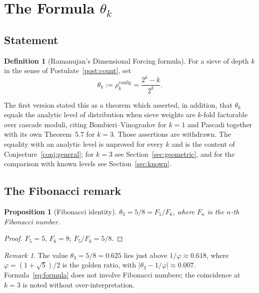 \documentclass[12pt]{amsart}
\theoremstyle{plain}
\newtheorem{proposition}[theorem]{Proposition}
\theoremstyle{definition}
\newtheorem{definition}[theorem]{Definition}
\theoremstyle{remark}
\newtheorem{remark}[theorem]{Remark}
\newcommand{\thetak}{\theta_k}
\newcommand{\rhoc}{\rho^{\mathrm{config}}}
\begin{document}
\section{The Formula $\thetak$}
\label{sec:formula}

\subsection{Statement}

\begin{definition}[Ramanujan's Dimensional Forcing formula]
\label{def:formula}
For a sieve of depth $k$ in the sense of Postulate~\ref{post:count}, set
\[
  \thetak := \rhoc_k = \frac{2^k - k}{2^k}.
\]
\end{definition}

The first version stated this as a theorem which asserted, in addition, that
$\thetak$ equals the analytic level of distribution when sieve weights are
$k$-fold factorable over cascade moduli, citing Bombieri--Vinogradov for $k=1$
and Pascadi together with its own Theorem~5.7 for $k=3$. Those assertions are
withdrawn. The equality with an analytic level is unproved for every $k$ and is
the content of Conjecture~\ref{conj:general}; for $k=3$ see
Section~\ref{sec:geometric}, and for the comparison with known levels see
Section~\ref{sec:known}.

\subsection{The Fibonacci remark}

\begin{proposition}[Fibonacci identity]
\label{prop:fibonacci}
$\theta_3 = 5/8 = F_5/F_6$, where $F_n$ is the $n$-th Fibonacci number.
\end{proposition}

\begin{proof}
$F_5 = 5$, $F_6 = 8$; $F_5/F_6 = 5/8$.
\end{proof}

\begin{remark}
The value $\theta_3 = 5/8 = 0.625$ lies just above $1/\varphi \approx 0.618$,
where $\varphi = (1+\sqrt{5})/2$ is the golden ratio, with
$|\theta_3 - 1/\varphi| \approx 0.007$. Formula~\eqref{eq:formula} does not
involve Fibonacci numbers; the coincidence at $k=3$ is noted without
over-interpretation.
\end{remark}
\end{document}
